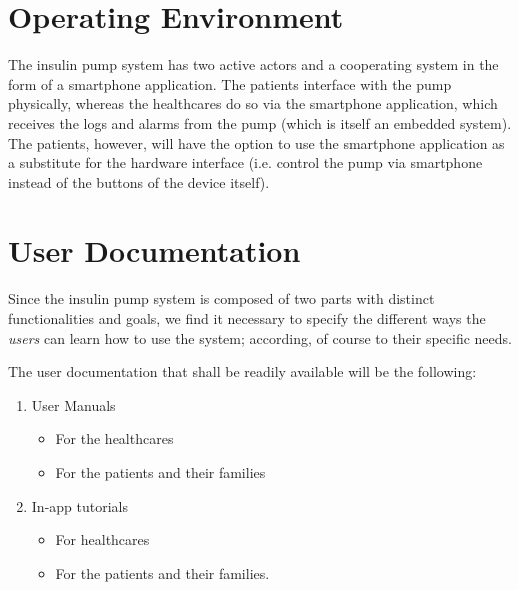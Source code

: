\documentclass{scrreprt}
\begin{document}
\section{Operating Environment}
The insulin pump system has two active actors and a cooperating system in the form of a smartphone application. The \glspl{patient} interface with the pump physically, whereas the \glspl{healthcare} do so 
via the smartphone application, which receives the logs and alarms from the pump (which is itself an embedded system). The \glspl{patient}, however, will have the option to use the smartphone application as a substitute
for the hardware interface (i.e. control the pump via smartphone instead of the buttons of the device itself).

\section{User Documentation}
Since the insulin pump system is composed of two parts with distinct functionalities and goals, we find it necessary to specify the different ways the \textsl{\glspl{user}} can learn how to use the system; according, of course
to their specific needs. 

The \gls{user} documentation that shall be readily available will be the following:

\begin{enumerate}
  \item User Manuals
    \begin{itemize}
      \item For the \glspl{healthcare}
      \item For the \glspl{patient} and their families
    \end{itemize}
  \item In-app tutorials
    \begin{itemize}
      \item For \glspl{healthcare}
      \item For the \glspl{patient} and their families.
    \end{itemize}
\end{enumerate}


\end{document}
